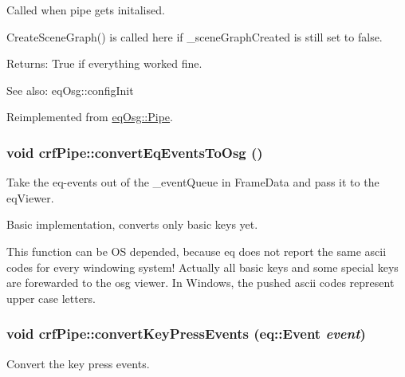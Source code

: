 Called when pipe gets initalised. 

CreateSceneGraph() is called here if \_\-sceneGraphCreated is still set to false. \begin{Desc}
\item[Returns:]True if everything worked fine. \end{Desc}
\begin{Desc}
\item[See also:]eqOsg::configInit \end{Desc}


Reimplemented from \hyperlink{a00014_d23bd6f7bb0f59f94fc0e279dbbb9d9a}{eqOsg::Pipe}.\hypertarget{a00006_16ff3017a9a333b3c7dd21b2032567c4}{
\subsubsection[{convertEqEventsToOsg}]{\setlength{\rightskip}{0pt plus 5cm}void crfPipe::convertEqEventsToOsg ()}}
\label{a00006_16ff3017a9a333b3c7dd21b2032567c4}


Take the eq-events out of the \_\-eventQueue in FrameData and pass it to the eqViewer. 

Basic implementation, converts only basic keys yet.

This function can be OS depended, because eq does not report the same ascii codes for every windowing system! Actually all basic keys and some special keys are forewarded to the osg viewer. In Windows, the pushed ascii codes represent upper case letters. \hypertarget{a00006_61564c072f120d8898e57cb268118f9a}{
\subsubsection[{convertKeyPressEvents}]{\setlength{\rightskip}{0pt plus 5cm}void crfPipe::convertKeyPressEvents (eq::Event {\em event})}}
\label{a00006_61564c072f120d8898e57cb268118f9a}


Convert the key press events. 

